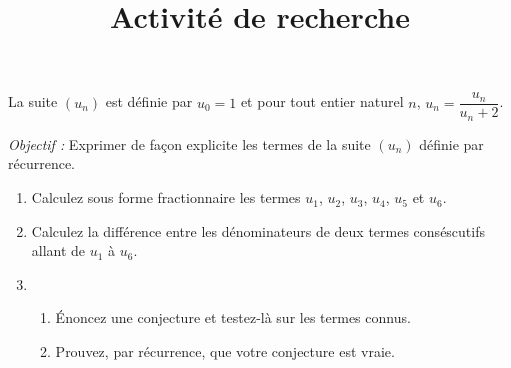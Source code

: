 \documentclass[a4paper,12pt,french]{article}
\title{Activité de recherche}
\date{}
\begin{document}
\maketitle

\begin{Exercise}[number=33]
  La suite $(u_n)$ est définie par $u_0 = 1$ et pour tout entier naturel
  $n$, $u_n = \dfrac{u_n}{u_n + 2}$.

  \emph{Objectif :} Exprimer de façon explicite les termes de la suite
  $(u_n)$ définie par récurrence.

  \begin{enumerate}
    \item Calculez sous forme fractionnaire les termes $u_1$, $u_2$,
      $u_3$, $u_4$, $u_5$ et $u_6$.
    \item Calculez la différence entre les dénominateurs de deux termes
      conséscutifs allant de $u_1$ à $u_6$.
    \item
      \begin{enumerate}
        \item Énoncez une conjecture et testez-là sur les termes connus.
        \item Prouvez, par récurrence, que votre conjecture est vraie.
      \end{enumerate}
  \end{enumerate}
\end{Exercise}
\pagebreak
\begin{Answer}[number=104]
\end{Answer}
\end{document}
